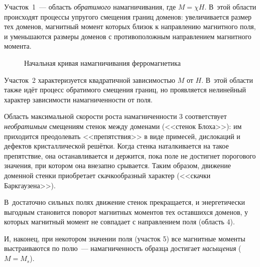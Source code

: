 Участок~1~--- область \emph{обратимого} намагничивания, где $M =\chi H$. В~этой области
происходят процессы упругого смещения границ доменов: увеличивается размер тех
доменов, магнитный момент которых близок к направлению магнитного поля, и
уменьшаются размеры доменов с противоположным направлением магнитного момента.

\pagebreak

\begin{wrapfigure}{o}{0.5\textwidth}
\centering{}
    \caption{Начальная кривая намагничивания ферромагнетика}
\end{wrapfigure}

Участок~2 характеризуется квадратичной зависимостью $M$ от $H$. В~этой области
также идёт процесс обратимого смещения границ, но проявляется нелинейный характер
зависимости намагниченности от поля.

Область максимальной скорости роста намагниченности 3 соответствует 
\emph{необратимым} смещениям стенок между доменами (<<стенок Блоха>>):
им приходится преодолевать <<препятствия>> в виде примесей,
дислокаций и дефектов кристаллической решётки.
Когда стенка наталкивается на такое препятствие, она останавливается и держится,
пока поле не достигнет порогового значения, при котором она внезапно
срывается. Таким образом, движение доменной стенки приобретает скачкообразный
характер (<<скачки Баркгаузена>>).


В~достаточно сильных полях движение стенок прекращается, и энергетически
выгодным становится поворот магнитных моментов тех оставшихся доменов, у которых
магнитный момент не совпадает с направлением поля (область 4).

И, наконец, при некотором значении поля (участок 5) все магнитные моменты
выстраиваются по полю~--- намагниченность образца достигает 
\emph{насыщения} ($M=M_s$).

